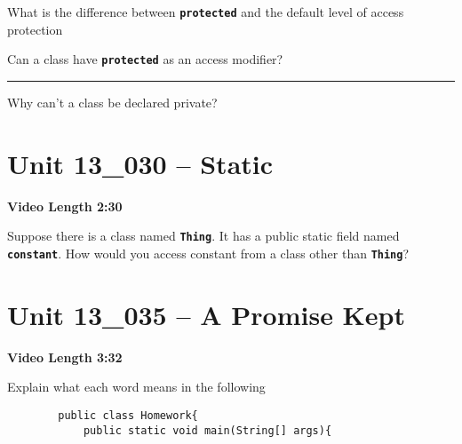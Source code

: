 \documentclass[letterpaper,12pt]{exam}
\newcommand{\unit}{Unit 13}
\begin{document}
\begin{questions}
\begin{samepage}
    \question What is the difference between \texttt{\textbf{protected}} and the default level of access protection
    \vspace{5mm}
\end{samepage}

\begin{samepage}
    \question Can a class have \texttt{\textbf{protected}} as an access modifier?
    \vspace{5mm}
\end{samepage}

\rule{20mm}{0.15mm}Why can't a class be declared private?

\section*{\unit\_030 -- Static } 
\par{\selectfont\textbf{Video Length 2:30}}
\begin{samepage}
    \question Suppose there is a class named \texttt{\textbf{Thing}}.  It has a public static field named \texttt{\textbf{constant}}.  How would you access constant from a class other than \texttt{\textbf{Thing}}?
    \vspace{5mm}
\end{samepage}


\section*{\unit\_035 -- A Promise Kept } 
\par{\selectfont\textbf{Video Length 3:32}}

\begin{samepage}
    \question Explain what each word means in the following
    \begin{verbatim}
        public class Homework{
            public static void main(String[] args){


\end{verbatim}
\end{samepage}
\end{questions}
\end{document}
